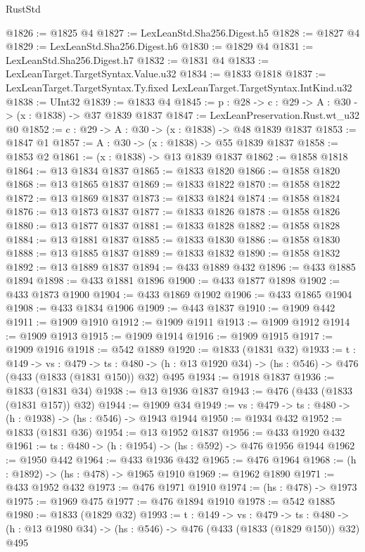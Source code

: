 \begin{lexlean}{RustStd}
\begin{coremodule}
@1826 := @1825 @4
@1827 := LexLeanStd.Sha256.Digest.h5
@1828 := @1827 @4
@1829 := LexLeanStd.Sha256.Digest.h6
@1830 := @1829 @4
@1831 := LexLeanStd.Sha256.Digest.h7
@1832 := @1831 @4
@1833 := LexLeanTarget.TargetSyntax.Value.u32
@1834 := @1833 @1818
@1837 := LexLeanTarget.TargetSyntax.Ty.fixed LexLeanTarget.TargetSyntax.IntKind.u32
@1838 := UInt32
@1839 := @1833 @4
@1845 := {p : @28} -> {c : @29} -> {A : @30} -> (x : @1838) -> @37 @1839 @1837
@1847 := LexLeanPreservation.Rust.wt_u32 @0
@1852 := {c : @29} -> {A : @30} -> (x : @1838) -> @48 @1839 @1837
@1853 := @1847 @1
@1857 := {A : @30} -> (x : @1838) -> @55 @1839 @1837
@1858 := @1853 @2
@1861 := (x : @1838) -> @13 @1839 @1837
@1862 := @1858 @1818
@1864 := @13 @1834 @1837
@1865 := @1833 @1820
@1866 := @1858 @1820
@1868 := @13 @1865 @1837
@1869 := @1833 @1822
@1870 := @1858 @1822
@1872 := @13 @1869 @1837
@1873 := @1833 @1824
@1874 := @1858 @1824
@1876 := @13 @1873 @1837
@1877 := @1833 @1826
@1878 := @1858 @1826
@1880 := @13 @1877 @1837
@1881 := @1833 @1828
@1882 := @1858 @1828
@1884 := @13 @1881 @1837
@1885 := @1833 @1830
@1886 := @1858 @1830
@1888 := @13 @1885 @1837
@1889 := @1833 @1832
@1890 := @1858 @1832
@1892 := @13 @1889 @1837
@1894 := @433 @1889 @432
@1896 := @433 @1885 @1894
@1898 := @433 @1881 @1896
@1900 := @433 @1877 @1898
@1902 := @433 @1873 @1900
@1904 := @433 @1869 @1902
@1906 := @433 @1865 @1904
@1908 := @433 @1834 @1906
@1909 := @443 @1837
@1910 := @1909 @442
@1911 := @1909 @1910
@1912 := @1909 @1911
@1913 := @1909 @1912
@1914 := @1909 @1913
@1915 := @1909 @1914
@1916 := @1909 @1915
@1917 := @1909 @1916
@1918 := @542 @1889
@1920 := @1833 (@1831 @32)
@1933 := {t : @149} ->
  {vs : @479} ->
  {ts : @480} -> (h : @13 @1920 @34) -> (hs : @546) -> @476 (@433 (@1833 (@1831 @150)) @32) @495
@1934 := @1918 @1837
@1936 := @1833 (@1831 @34)
@1938 := @13 @1936 @1837
@1943 := @476 (@433 (@1833 (@1831 @157)) @32)
@1944 := @1909 @34
@1949 := {vs : @479} -> {ts : @480} -> (h : @1938) -> (hs : @546) -> @1943 @1944
@1950 := @1934 @432
@1952 := @1833 (@1831 @36)
@1954 := @13 @1952 @1837
@1956 := @433 @1920 @432
@1961 := {ts : @480} -> (h : @1954) -> (hs : @592) -> @476 @1956 @1944
@1962 := @1950 @442
@1964 := @433 @1936 @432
@1965 := @476 @1964
@1968 := (h : @1892) -> (hs : @478) -> @1965 @1910
@1969 := @1962 @1890
@1971 := @433 @1952 @432
@1973 := @476 @1971 @1910
@1974 := (hs : @478) -> @1973
@1975 := @1969 @475
@1977 := @476 @1894 @1910
@1978 := @542 @1885
@1980 := @1833 (@1829 @32)
@1993 := {t : @149} ->
  {vs : @479} ->
  {ts : @480} -> (h : @13 @1980 @34) -> (hs : @546) -> @476 (@433 (@1833 (@1829 @150)) @32) @495

\end{coremodule}
\end{lexlean}
